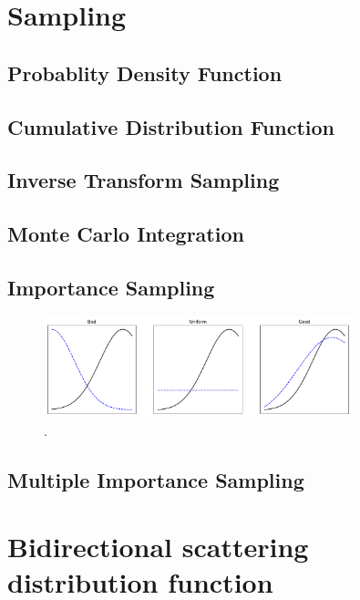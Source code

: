 \section{Sampling}

\subsection{Probablity Density Function}

\subsection{Cumulative Distribution Function}

\subsection{Inverse Transform Sampling}

\subsection{Monte Carlo Integration}
\label{sec:MC}

\subsection{Importance Sampling}
\label{sec:IS}


\begin{figure}
    \centering
    \includegraphics[width=0.8\textwidth]{figures/plots/importancesampling.pdf}
    \caption{.}
    \label{fig:importancesample}
\end{figure}

\subsection{Multiple Importance Sampling}

\section{Bidirectional scattering distribution function}


